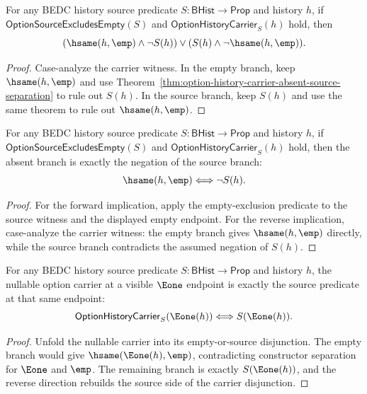 \begin{theorem}
\label{thm:option-history-carrier-exclusive-readback}
For any BEDC history source predicate $S:\mathsf{BHist}\to\mathsf{Prop}$ and
history $h$, if $\mathsf{OptionSourceExcludesEmpty}(S)$ and
$\mathsf{OptionHistoryCarrier}_S(h)$ hold, then
$$
(\hsame(h,\emp)\land\neg S(h))\lor(S(h)\land\neg\hsame(h,\emp)).
$$
\end{theorem}
\begin{proof}
Case-analyze the carrier witness. In the empty branch, keep
$\hsame(h,\emp)$ and use
Theorem~\ref{thm:option-history-carrier-absent-source-separation} to rule out
$S(h)$. In the source branch, keep $S(h)$ and use the same theorem to rule out
$\hsame(h,\emp)$.
\end{proof}

\begin{theorem}
\label{thm:option-history-carrier-absent-not-source-iff}
For any BEDC history source predicate $S:\mathsf{BHist}\to\mathsf{Prop}$ and
history $h$, if $\mathsf{OptionSourceExcludesEmpty}(S)$ and
$\mathsf{OptionHistoryCarrier}_S(h)$ hold, then the absent branch is exactly
the negation of the source branch:
$$
\hsame(h,\emp)\Longleftrightarrow\neg S(h).
$$
\end{theorem}
\begin{proof}
For the forward implication, apply the empty-exclusion predicate to the source
witness and the displayed empty endpoint. For the reverse implication,
case-analyze the carrier witness: the empty branch gives $\hsame(h,\emp)$
directly, while the source branch contradicts the assumed negation of $S(h)$.
\end{proof}

\begin{theorem}
\label{thm:option-history-carrier-e1-source-iff}
For any BEDC history source predicate $S:\mathsf{BHist}\to\mathsf{Prop}$ and
history $h$, the nullable option carrier at a visible $\Eone$ endpoint is
exactly the source predicate at that same endpoint:
$$
\mathsf{OptionHistoryCarrier}_S(\Eone(h))
\Longleftrightarrow
S(\Eone(h)).
$$
\end{theorem}
\begin{proof}
Unfold the nullable carrier into its empty-or-source disjunction. The empty
branch would give $\hsame(\Eone(h),\emp)$, contradicting constructor
separation for $\Eone$ and $\emp$. The remaining branch is exactly
$S(\Eone(h))$, and the reverse direction rebuilds the source side of the
carrier disjunction.
\end{proof}

